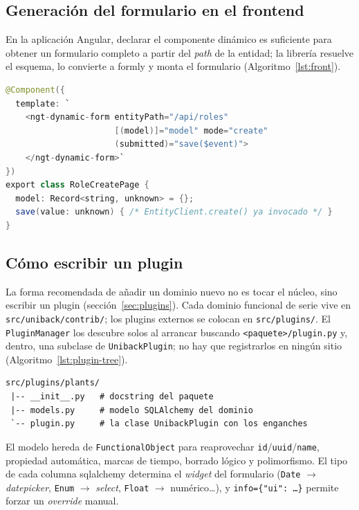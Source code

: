 \subsection{Generación del formulario en el frontend}
En la aplicación Angular, declarar el componente dinámico es suficiente para
obtener un formulario completo a partir del \emph{path} de la entidad; la
librería resuelve el esquema, lo convierte a \gls{formly} y monta el formulario
(Algoritmo~\ref{lst:front}).

\begin{lstlisting}[language=Java, caption={Formulario dinámico en una vista Angular}, label={lst:front}]
@Component({
  template: `
    <ngt-dynamic-form entityPath="/api/roles"
                      [(model)]="model" mode="create"
                      (submitted)="save($event)">
    </ngt-dynamic-form>`
})
export class RoleCreatePage {
  model: Record<string, unknown> = {};
  save(value: unknown) { /* EntityClient.create() ya invocado */ }
}
\end{lstlisting}

\subsection{Cómo escribir un plugin}
La forma recomendada de añadir un dominio nuevo no es tocar el núcleo, sino
escribir un \gls{plugin} (sección~\ref{sec:plugins}). Cada dominio funcional de
serie vive en \texttt{src/\allowbreak uniback/\allowbreak contrib/}; los plugins externos se colocan en
\texttt{src/\allowbreak plugins/}. El \texttt{PluginManager} los descubre solos al arrancar
buscando \texttt{<paquete>/plugin.py} y, dentro, una subclase de
\texttt{UnibackPlugin}; no hay que registrarlos en ningún sitio
(Algoritmo~\ref{lst:plugin-tree}).

\begin{lstlisting}[style=docker, caption={Estructura mínima de un plugin externo}, label={lst:plugin-tree}]
 src/plugins/plants/
 |-- __init__.py   # docstring del paquete
 |-- models.py     # modelo SQLAlchemy del dominio
 `-- plugin.py     # la clase UnibackPlugin con los enganches
\end{lstlisting}

El modelo hereda de \texttt{FunctionalObject} para reaprovechar
\texttt{id}/\texttt{uuid}/\texttt{name}, propiedad automática, marcas de tiempo,
borrado lógico y polimorfismo. El tipo de cada columna \gls{sqlalchemy}
determina el \emph{widget} del formulario (\texttt{Date} $\rightarrow$
\emph{datepicker}, \texttt{Enum} $\rightarrow$ \emph{select}, \texttt{Float}
$\rightarrow$ numérico\dots), y \texttt{info=\{"ui": \dots\}} permite forzar un
\emph{override} manual.

